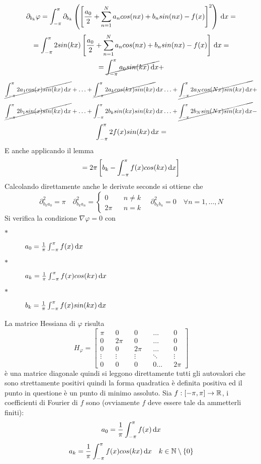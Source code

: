 \[\partial_{b_k}\varphi = \int_{-\pi}^{\pi}\partial_{b_k}\left(\left[\frac{a_0}{2}+\sum\limits_{n=1}^{N}a_{n}cos(nx)+b_{n}sin(nx)-f(x)\right]^2\right)\,\mathrm{d}{x}=\]
\[ = \int_{-\pi}^{\pi} 2sin(kx) \left[\frac{a_0}{2}+\sum\limits_{n=1}^{N}a_{n}cos(nx)+b_{n}sin(nx)-f(x)\right]\,\mathrm{d}{x}=\]
\[ =  \cancel{\int_{-\pi}^{\pi} a_0sin(kx)\,\mathrm{d}{x}} + \]
\[\cancel{\int_{-\pi}^{\pi} 2a_1cos(x)sin(kx)\,\mathrm{d}{x}} +
\ldots +
\cancel{\int_{-\pi}^{\pi} 2a_kcos(kx)sin(kx)}\,\mathrm{d}{x}
\ldots +
\cancel{\int_{-\pi}^{\pi} 2a_Ncos(Nx)sin(kx)\,\mathrm{d}{x}} + \]
\[\cancel{\int_{-\pi}^{\pi} 2b_1sin(x)sin(kx)\,\mathrm{d}{x}} +
\ldots +
\int_{-\pi}^{\pi} 2b_ksin(kx)sin(kx)\,\mathrm{d}{x}
\ldots +
\cancel{\int_{-\pi}^{\pi} 2b_Nsin(Nx)sin(kx)\,\mathrm{d}{x}} - \]
\[\int_{-\pi}^{\pi} 2f(x)sin(kx)\,\mathrm{d}{x} = \]
E anche applicando il lemma
\[=2\pi\left[b_k-\int_{-\pi}^{\pi}f(x)cos(kx)\,\mathrm{d}{x}\right]\]
Calcolando direttamente anche le derivate seconde si ottiene che
\[\partial^2_{b_ka_0}=\pi\quad\partial^2_{b_ka_n}=
\left\{\begin{matrix}
0&&n\ne k\\2\pi&&n=k
\end{matrix}\right.
\quad\partial^2_{b_kb_n}=0\quad\forall n=1,\dotsc,N\]
Si verifica la condizione $\nabla\varphi = 0$ con
\begin{description}
	\item[$\ast$] $a_0=\frac{1}{\pi}\int_{-\pi}^{\pi}f(x)\,\mathrm{d}{x}$
	\item[$\ast$] $a_k=\frac{1}{\pi}\int_{-\pi}^{\pi}f(x)cos(kx)\,\mathrm{d}{x}$
	\item[$\ast$] $b_k=\frac{1}{\pi}\int_{-\pi}^{\pi}f(x)sin(kx)\,\mathrm{d}{x}$
\end{description}
La matrice Hessiana di $\varphi$ risulta \[H_{\varphi}=\left[\begin{matrix}
\pi&&0&&0&&\ldots&&0\\
0&&2\pi&&0&&\ldots&&0\\
0&&0&&2\pi&&\ldots&&0\\
\vdots&&\vdots&&\vdots&&\ddots&&\vdots\\
0&&0&&0&&0\ldots&&2\pi
\end{matrix}\right]\]
è una matrice diagonale quindi si leggono direttamente tutti gli autovalori che sono strettamente positivi quindi la forma quadratica è definita positiva ed il punto in questione è un punto di minimo assoluto.
Sia $f: \left[-\pi,\pi\right] \to \mathbb{R}$, i coefficienti di Fourier di $f$ sono (ovviamente $f$ deve essere tale da ammetterli finiti):
\[a_0=\frac{1}{\pi}\int_{-\pi}^{\pi}f(x)\,\mathrm{d}{x}\]
\[a_k=\frac{1}{\pi}\int_{-\pi}^{\pi}f(x)cos(kx)\,\mathrm{d}{x}\quad k\in\mathbb{N}\setminus{\left\{0\right\}}\]
